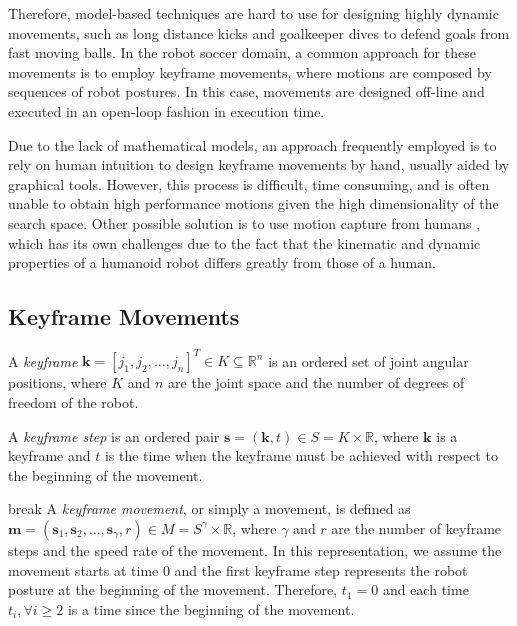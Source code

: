 Therefore, model-based techniques are hard to use for designing highly dynamic movements, such as long distance kicks and goalkeeper dives to defend goals from fast moving balls. In the robot soccer domain, a common approach for these movements is to employ keyframe movements, where motions are composed by sequences of robot postures. In this case, movements are designed off-line and executed in an open-loop fashion in execution time.

Due to the lack of mathematical models, an approach frequently employed is to rely on human intuition to design keyframe movements by hand, usually aided by graphical tools. However, this process is difficult, time consuming, and is often unable to obtain high performance motions given the high dimensionality of the search space. Other possible solution is to use motion capture from humans \cite{shon2005}, which has its own challenges due to the fact that the kinematic and dynamic properties of a humanoid robot differs greatly from those of a human.

\subsection{Keyframe Movements}\label{sec:keyframe-movements}

\begin{definition}
A \emph{keyframe} \( \mathrm{\mathbf{k}} = \left[ j_1, j_2, \dots, j_n \right]^T \in K \subseteq \mathbb{R}^n \) is an ordered set of joint angular positions, where \( K \) and \( n \) are the joint space and the number of degrees of freedom of the robot.
\end{definition}

\begin{definition}
A \emph{keyframe step} is an ordered pair \( \mathrm{\mathbf{s}} = \left( \mathrm{\mathbf{k}}, t \right) \in S = K \times \mathbb{R} \), where \( \mathrm{\mathbf{k}} \) is a keyframe and \( t \) is the time when the keyframe must be achieved with respect to the beginning of the movement. 
\end{definition}

\begin{definition}{break}
A \emph{keyframe movement}, or simply a movement, is defined as \( \mathrm{\mathbf{m}} = \left( \mathrm{\mathbf{s}}_1, \mathrm{\mathbf{s}}_2, \dots, \mathrm{\mathbf{s}}_{\gamma}, r \right) \in M = S^{\gamma} \times \mathbb{R} \), where \( \gamma \) and \( r \) are the number of keyframe steps and the speed rate of the movement. In this representation, we assume the movement starts at time 0 and the first keyframe step represents the robot posture at the beginning of the movement. Therefore, \( t_1 = 0 \) and each time \( t_i, \forall i \geq 2 \) is a time since the beginning of the movement.
\end{definition}

